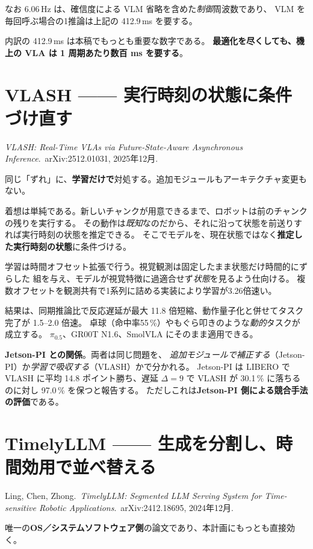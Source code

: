 \documentclass[11pt,a4paper]{article}
\newcommand{\prob}[1]{\textbf{\textcolor{red!55!black}{#1}}}
\newcommand{\keyp}[1]{\textbf{\textcolor{blue!45!black}{#1}}}
\begin{document}
なお 6.06\,Hz は、確信度による VLM 省略を含めた\emph{制御}周波数であり、
VLM を毎回呼ぶ場合の1推論は上記の 412.9\,ms を要する。

内訳の 412.9\,ms は本稿でもっとも重要な数字である。
\keyp{最適化を尽くしても、機上の VLA は 1 周期あたり数百 ms を要する}。

\section{VLASH —— 実行時刻の状態に条件づけ直す}

\noindent
\emph{VLASH: Real-Time VLAs via Future-State-Aware Asynchronous Inference}.\
arXiv:2512.01031, 2025年12月.

同じ「ずれ」に、\keyp{学習だけで}対処する。追加モジュールもアーキテクチャ変更もない。

着想は単純である。新しいチャンクが用意できるまで、ロボットは前のチャンクの残りを実行する。
その動作は\emph{既知}なのだから、それに沿って状態を前送りすれば実行時刻の状態を推定できる。
そこでモデルを、現在状態ではなく\keyp{推定した実行時刻の状態}に条件づける。

学習は時間オフセット拡張で行う。視覚観測は固定したまま状態だけ時間的にずらした
組を与え、モデルが視覚特徴に過適合せず\emph{状態}を見るよう仕向ける。
複数オフセットを観測共有で1系列に詰める実装により学習が3.26倍速い。

結果は、同期推論比で反応遅延が最大 11.8 倍短縮、動作量子化と併せてタスク完了が 1.5--2.0 倍速。
卓球（命中率55\,\%）やもぐら叩きのような\emph{動的}タスクが成立する。
$\pi_{0.5}$、GR00T N1.6、SmolVLA にそのまま適用できる。

\keyp{Jetson-PI との関係}。両者は同じ問題を、
\emph{追加モジュールで補正する}（Jetson-PI）か\emph{学習で吸収する}（VLASH）かで分かれる。
Jetson-PI は LIBERO で VLASH に平均 14.8 ポイント勝ち、遅延 $\Delta=9$ で
VLASH が 30.1\,\% に落ちるのに対し 97.0\,\% を保つと報告する。
ただしこれは\prob{Jetson-PI 側による競合手法の評価}である。

\section{TimelyLLM —— 生成を分割し、時間効用で並べ替える}

\noindent
Ling, Chen, Zhong.\ \emph{TimelyLLM: Segmented LLM Serving System for
Time-sensitive Robotic Applications}.\ arXiv:2412.18695, 2024年12月.

唯一の\keyp{OS／システムソフトウェア側}の論文であり、本計画にもっとも直接効く。
\end{document}
